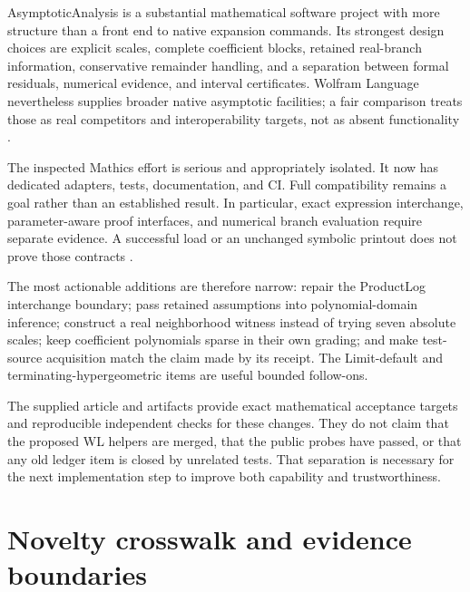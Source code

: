 \documentclass[11pt,a4paper]{article}
\theoremstyle{remark}
\begin{document}
AsymptoticAnalysis is a substantial mathematical software project with more structure than a front end to native expansion commands. Its strongest design choices are explicit scales, complete coefficient blocks, retained real-branch information, conservative remainder handling, and a separation between formal residuals, numerical evidence, and interval certificates. Wolfram Language nevertheless supplies broader native asymptotic facilities; a fair comparison treats those as real competitors and interoperability targets, not as absent functionality \cite{core,wlasymptotic,wlasymptoticsolve,wldiscrete}.

The inspected Mathics effort is serious and appropriately isolated. It now has dedicated adapters, tests, documentation, and CI. Full compatibility remains a goal rather than an established result. In particular, exact expression interchange, parameter-aware proof interfaces, and numerical branch evaluation require separate evidence. A successful load or an unchanged symbolic printout does not prove those contracts \cite{compatibility,mathicsci,mathicscorefunctions}.

The most actionable additions are therefore narrow: repair the ProductLog interchange boundary; pass retained assumptions into polynomial-domain inference; construct a real neighborhood witness instead of trying seven absolute scales; keep coefficient polynomials sparse in their own grading; and make test-source acquisition match the claim made by its receipt. The Limit-default and terminating-hypergeometric items are useful bounded follow-ons.

The supplied article and artifacts provide exact mathematical acceptance targets and reproducible independent checks for these changes. They do not claim that the proposed WL helpers are merged, that the public probes have passed, or that any old ledger item is closed by unrelated tests. That separation is necessary for the next implementation step to improve both capability and trustworthiness.

\appendix
\section{Novelty crosswalk and evidence boundaries}
\end{document}
